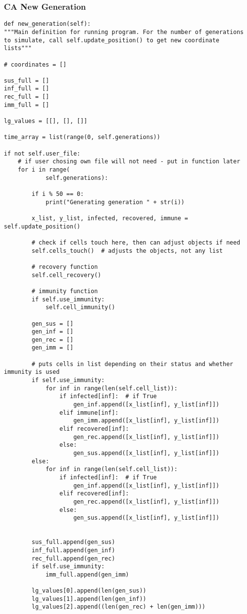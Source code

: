 \documentclass[11pt, a4paper]{article}
\begin{document}
\subsubsection{CA New Generation}
\begin{lstlisting}
def new_generation(self):
"""Main definition for running program. For the number of generations to simulate, call self.update_position() to get new coordinate lists"""

# coordinates = []

sus_full = []
inf_full = []
rec_full = []
imm_full = []

lg_values = [[], [], []]

time_array = list(range(0, self.generations))

if not self.user_file:
    # if user chosing own file will not need - put in function later
    for i in range(
            self.generations):

        if i % 50 == 0:
            print("Generating generation " + str(i))

        x_list, y_list, infected, recovered, immune = self.update_position()

        # check if cells touch here, then can adjust objects if need
        self.cells_touch()  # adjusts the objects, not any list

        # recovery function
        self.cell_recovery()

        # immunity function
        if self.use_immunity:
            self.cell_immunity()

        gen_sus = []
        gen_inf = []
        gen_rec = []
        gen_imm = []

        # puts cells in list depending on their status and whether immunity is used
        if self.use_immunity:
            for inf in range(len(self.cell_list)):
                if infected[inf]:  # if True
                    gen_inf.append([x_list[inf], y_list[inf]])
                elif immune[inf]:
                    gen_imm.append([x_list[inf], y_list[inf]])
                elif recovered[inf]:
                    gen_rec.append([x_list[inf], y_list[inf]])
                else:
                    gen_sus.append([x_list[inf], y_list[inf]])
        else:
            for inf in range(len(self.cell_list)):
                if infected[inf]:  # if True
                    gen_inf.append([x_list[inf], y_list[inf]])
                elif recovered[inf]:
                    gen_rec.append([x_list[inf], y_list[inf]])
                else:
                    gen_sus.append([x_list[inf], y_list[inf]])
                    

        sus_full.append(gen_sus)
        inf_full.append(gen_inf)
        rec_full.append(gen_rec)
        if self.use_immunity:
            imm_full.append(gen_imm)

        lg_values[0].append(len(gen_sus))
        lg_values[1].append(len(gen_inf))
        lg_values[2].append((len(gen_rec) + len(gen_imm)))

\end{lstlisting}
\end{document}
